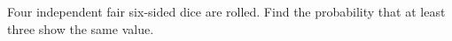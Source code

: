 Four independent fair six-sided dice are rolled. Find the probability that at least three show the same value.
